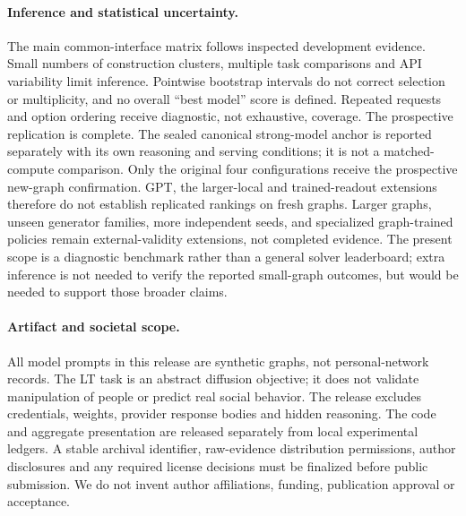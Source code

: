 \paragraph{Inference and statistical uncertainty.}
The main common-interface matrix follows inspected development evidence.
Small numbers of construction clusters, multiple task comparisons and API
variability limit inference. Pointwise bootstrap intervals do not correct
selection or multiplicity, and no overall ``best model'' score is defined.
Repeated requests and option ordering receive diagnostic, not exhaustive,
coverage. The prospective replication is complete.
The sealed canonical strong-model anchor is reported separately with its
own reasoning and serving conditions; it is not a matched-compute comparison.
Only the original four configurations receive the prospective new-graph
confirmation. GPT, the larger-local and trained-readout extensions therefore
do not establish replicated rankings on fresh graphs. Larger graphs, unseen
generator families, more independent seeds, and specialized graph-trained
policies remain external-validity extensions, not completed evidence.
The present scope is a diagnostic benchmark rather than a general solver
leaderboard; extra inference is not needed to verify the reported small-graph
outcomes, but would be needed to support those broader claims.

\paragraph{Artifact and societal scope.}
All model prompts in this release are synthetic graphs, not personal-network
records. The LT task is an abstract diffusion objective; it does not validate
manipulation of people or predict real social behavior. The release excludes
credentials, weights, provider response bodies and hidden reasoning.
The code and aggregate presentation are released separately from local
experimental ledgers. A stable archival identifier, raw-evidence distribution
permissions, author disclosures and any required license decisions must be
finalized before public submission. We do not
invent author affiliations, funding, publication approval or acceptance.
